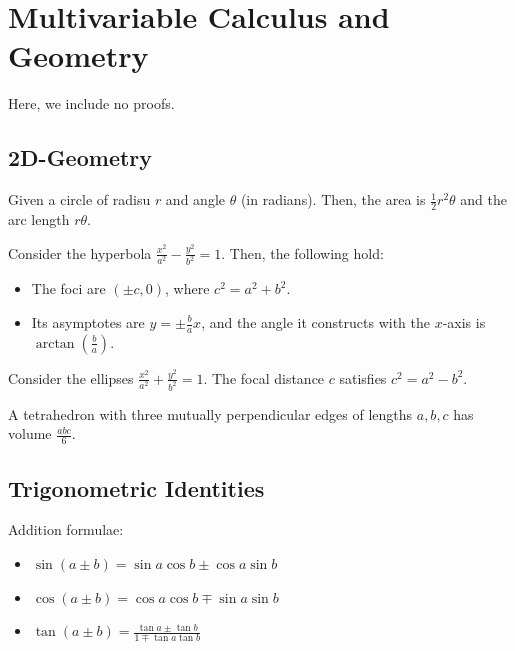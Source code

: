 \section{Multivariable Calculus and Geometry}

Here, we include no proofs.

\subsection{2D-Geometry}

\begin{proposition}
Given a circle of radisu $r$ and angle $\theta$ (in radians). Then, 
the area is $\frac{1}{2}r^2 \theta$ and the arc length $r \theta$.
\end{proposition}

\begin{proposition}[Hyperbola]
Consider the hyperbola $\frac{x^2}{a^2}-\frac{y^2}{b^2}=1$. 
Then, the following hold:
\begin{itemize}
\item The foci are $(\pm c, 0)$, where $c^2 = a^2 + b^2$.
\item Its asymptotes are $y = \pm \frac{b}{a}x$, and the angle it constructs with 
the $x$-axis is $\arctan \left(\frac{b}{a}\right)$.
\end{itemize}
\end{proposition}

\begin{proposition}[Ellipses]
Consider the ellipses $\frac{x^2}{a^2}+\frac{y^2}{b^2}=1$. The 
focal distance $c$ satisfies $c^2 = a^2 - b^2$.
\end{proposition}

\begin{proposition}
A tetrahedron with three mutually perpendicular edges of lengths $a,b,c$ 
has volume $\frac{abc}{6}$.
\end{proposition}


\subsection{Trigonometric Identities}

Addition formulae:
\begin{itemize}
\item $\sin(a\pm b)=\sin a\cos b\pm\cos a\sin b$
\item $\cos(a\pm b)=\cos a\cos b\mp\sin a\sin b$
\item $\tan(a\pm b)=\frac{\tan a\pm\tan b}{1\mp\tan a\tan b}$
\end{itemize}


